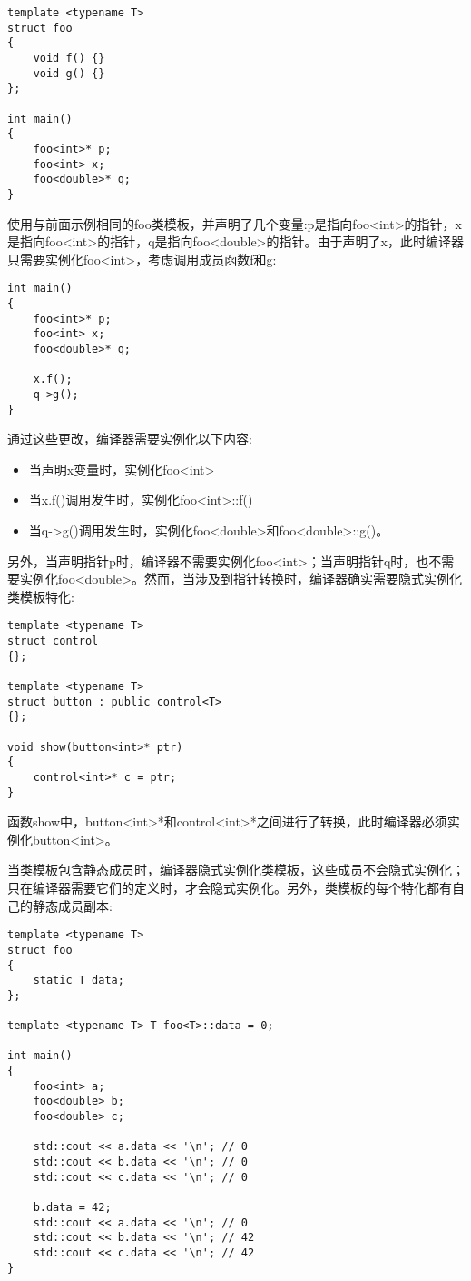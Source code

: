 \begin{lstlisting}[style=styleCXX]
template <typename T>
struct foo
{
	void f() {}
	void g() {}
};

int main()
{
	foo<int>* p;
	foo<int> x;
	foo<double>* q;
}
\end{lstlisting}

使用与前面示例相同的foo类模板，并声明了几个变量:p是指向foo<int>的指针，x是指向foo<int>的指针，q是指向foo<double>的指针。由于声明了x，此时编译器只需要实例化foo<int>，考虑调用成员函数f和g:

\begin{lstlisting}[style=styleCXX]
int main()
{
	foo<int>* p;
	foo<int> x;
	foo<double>* q;
	
	x.f();
	q->g();
}
\end{lstlisting}

通过这些更改，编译器需要实例化以下内容:

\begin{itemize}
\item 
当声明x变量时，实例化foo<int>

\item 
当x.f()调用发生时，实例化foo<int>::f()

\item 
当q->g()调用发生时，实例化foo<double>和foo<double>::g()。
\end{itemize}

另外，当声明指针p时，编译器不需要实例化foo<int>；当声明指针q时，也不需要实例化foo<double>。然而，当涉及到指针转换时，编译器确实需要隐式实例化类模板特化:

\begin{lstlisting}[style=styleCXX]
template <typename T>
struct control
{};

template <typename T>
struct button : public control<T>
{};

void show(button<int>* ptr)
{
	control<int>* c = ptr;
}
\end{lstlisting}

函数show中，button<int>*和control<int>*之间进行了转换，此时编译器必须实例化button<int>。

当类模板包含静态成员时，编译器隐式实例化类模板，这些成员不会隐式实例化；只在编译器需要它们的定义时，才会隐式实例化。另外，类模板的每个特化都有自己的静态成员副本:

\begin{lstlisting}[style=styleCXX]
template <typename T>
struct foo
{
	static T data;
};

template <typename T> T foo<T>::data = 0;

int main()
{
	foo<int> a;
	foo<double> b;
	foo<double> c;
	
	std::cout << a.data << '\n'; // 0
	std::cout << b.data << '\n'; // 0
	std::cout << c.data << '\n'; // 0
	
	b.data = 42;
	std::cout << a.data << '\n'; // 0
	std::cout << b.data << '\n'; // 42
	std::cout << c.data << '\n'; // 42
}
\end{lstlisting}

